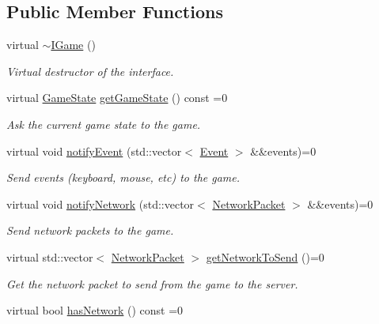 \subsection*{Public Member Functions}
\begin{DoxyCompactItemize}
\item 
virtual \hyperlink{classarcade_1_1_i_game_a89114f708822e3d0db5b58901c1e2354}{$\sim$\+I\+Game} ()
\begin{DoxyCompactList}\small\item\em Virtual destructor of the interface. \end{DoxyCompactList}\item 
virtual \hyperlink{namespacearcade_a6adca89ee2f539b03980c7e59b044ed7}{Game\+State} \hyperlink{classarcade_1_1_i_game_a75083f0465c0ccbdbbb38c689b4a694c}{get\+Game\+State} () const =0
\begin{DoxyCompactList}\small\item\em Ask the current game state to the game. \end{DoxyCompactList}\item 
virtual void \hyperlink{classarcade_1_1_i_game_a37d164b4052fa3c28256fb0bf0002876}{notify\+Event} (std\+::vector$<$ \hyperlink{structarcade_1_1_event}{Event} $>$ \&\&events)=0
\begin{DoxyCompactList}\small\item\em Send events (keyboard, mouse, etc) to the game. \end{DoxyCompactList}\item 
virtual void \hyperlink{classarcade_1_1_i_game_aaf375290947abf3db32d966facbfacf3}{notify\+Network} (std\+::vector$<$ \hyperlink{structarcade_1_1_network_packet}{Network\+Packet} $>$ \&\&events)=0
\begin{DoxyCompactList}\small\item\em Send network packets to the game. \end{DoxyCompactList}\item 
virtual std\+::vector$<$ \hyperlink{structarcade_1_1_network_packet}{Network\+Packet} $>$ \hyperlink{classarcade_1_1_i_game_a5aa80dfdb3c1881fbc749e3d53efc6f8}{get\+Network\+To\+Send} ()=0
\begin{DoxyCompactList}\small\item\em Get the network packet to send from the game to the server. \end{DoxyCompactList}\item 
virtual bool \hyperlink{classarcade_1_1_i_game_ae66bf253e252f43ce17d9e94f08a1d1c}{has\+Network} () const =0

\end{DoxyCompactItemize}
